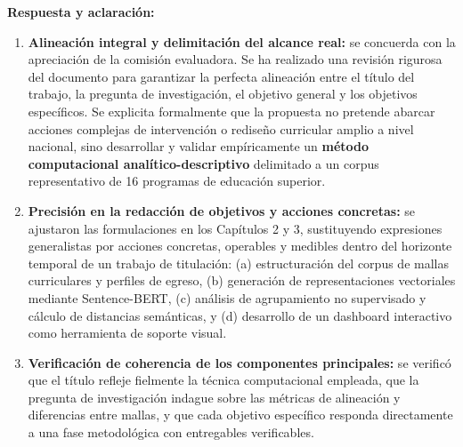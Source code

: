 \noindent
\textbf{Respuesta y aclaración:}
\begin{enumerate}[leftmargin=*]
	\item \textbf{Alineación integral y delimitación del alcance real:} se concuerda con la apreciación de la comisión evaluadora. Se ha realizado una revisión rigurosa del documento para garantizar la perfecta alineación entre el título del trabajo, la pregunta de investigación, el objetivo general y los objetivos específicos. Se explicita formalmente que la propuesta no pretende abarcar acciones complejas de intervención o rediseño curricular amplio a nivel nacional, sino desarrollar y validar empíricamente un \textbf{método computacional analítico-descriptivo} delimitado a un corpus representativo de 16 programas de educación superior.
	\item \textbf{Precisión en la redacción de objetivos y acciones concretas:} se ajustaron las formulaciones en los Capítulos 2 y 3, sustituyendo expresiones generalistas por acciones concretas, operables y medibles dentro del horizonte temporal de un trabajo de titulación: (a) estructuración del corpus de mallas curriculares y perfiles de egreso, (b) generación de representaciones vectoriales mediante Sentence-BERT, (c) análisis de agrupamiento no supervisado y cálculo de distancias semánticas, y (d) desarrollo de un dashboard interactivo como herramienta de soporte visual.
	\item \textbf{Verificación de coherencia de los componentes principales:} se verificó que el título refleje fielmente la técnica computacional empleada, que la pregunta de investigación indague sobre las métricas de alineación y diferencias entre mallas, y que cada objetivo específico responda directamente a una fase metodológica con entregables verificables.
\end{enumerate}

\vspace{0.4cm}

\noindent
{}

